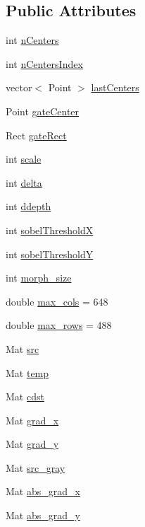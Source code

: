 \subsection*{Public Attributes}
\begin{DoxyCompactItemize}
\item 
int \hyperlink{classBlueBinDetector_aa5ee31b4f78070d90c96360e70c2710e}{n\+Centers}
\item 
int \hyperlink{classBlueBinDetector_aa32db58c1084261fc82510a1f7647dd4}{n\+Centers\+Index}
\item 
vector$<$ Point $>$ \hyperlink{classBlueBinDetector_a3f15b441edbe4a372c25a2a14e5dd238}{last\+Centers}
\item 
Point \hyperlink{classBlueBinDetector_aaa3974bddf370c5f3054b8b28018d935}{gate\+Center}
\item 
Rect \hyperlink{classBlueBinDetector_a2c467050d739ce4b5f17776dc1acff99}{gate\+Rect}
\item 
int \hyperlink{classBlueBinDetector_a27c2322e9231eada3fd026d8b4859b55}{scale}
\item 
int \hyperlink{classBlueBinDetector_aaceda035648f9c683f999a0180bc8d06}{delta}
\item 
int \hyperlink{classBlueBinDetector_a28df18b6bb12bdf794a26c10bcf85397}{ddepth}
\item 
int \hyperlink{classBlueBinDetector_af8ec4d3b2864d710e7d9ac9904112d09}{sobel\+ThresholdX}
\item 
int \hyperlink{classBlueBinDetector_ac032afb6b48bac1eeb42b403639f658a}{sobel\+ThresholdY}
\item 
int \hyperlink{classBlueBinDetector_af0495b5bbc1c64cde69868bbbac6abac}{morph\+\_\+size}
\item 
double \hyperlink{classBlueBinDetector_a3d8f5991f9e6c26469aa38ae3e745d37}{max\+\_\+cols} = 648
\item 
double \hyperlink{classBlueBinDetector_ace70d074bc205720fd99ec320f94a505}{max\+\_\+rows} = 488
\item 
Mat \hyperlink{classBlueBinDetector_a7c504bb250864d343055259170b8fd34}{src}
\item 
Mat \hyperlink{classBlueBinDetector_a65e2e4304509a31a7b8bf9b364d737c4}{temp}
\item 
Mat \hyperlink{classBlueBinDetector_aa0ed8edd7704a48c8800fe540ccba4cf}{cdst}
\item 
Mat \hyperlink{classBlueBinDetector_a019c17d08994bd65639f8f3eacd493ef}{grad\+\_\+x}
\item 
Mat \hyperlink{classBlueBinDetector_a55e3da3811d564d3111050e7357226b7}{grad\+\_\+y}
\item 
Mat \hyperlink{classBlueBinDetector_a87c0a2aee3ddf650aa602338fa39975a}{src\+\_\+gray}
\item 
Mat \hyperlink{classBlueBinDetector_a0986ca569b3c09665b30068dbc4934aa}{abs\+\_\+grad\+\_\+x}
\item 
Mat \hyperlink{classBlueBinDetector_a13cdb9e7f123655fa04c526eaa8fe81e}{abs\+\_\+grad\+\_\+y}
\end{DoxyCompactItemize}


